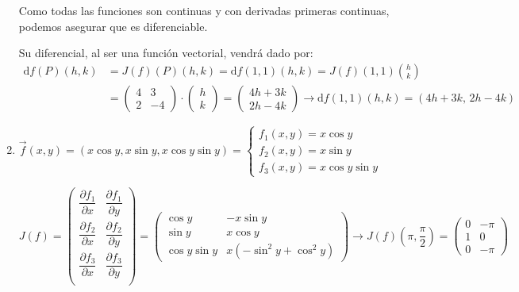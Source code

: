 \begin{enumerate}[label=\c olor{red}\textbf{\arabic*)}, leftmargin=*]
Como todas las funciones son continuas y con derivadas primeras continuas, podemos asegurar que es diferenciable.

Su diferencial, al ser una función vectorial, vendrá dado por:
\[ \begin{aligned}
\mathrm{d}f(P)(h,k)&=J(f)(P)(h,k)=\mathrm{d}f(1,1)(h,k)=J(f)(1,1)\binom{h}{k}\\
&=\begin{pmatrix}
4 & 3 \\
2 & -4
\end{pmatrix}\cdot\begin{pmatrix}
h\\
k
\end{pmatrix}=\begin{pmatrix}
4h+3k\\
2h-4k
\end{pmatrix}\longrightarrow \mathrm{d}f(1,1)(h,k)=(4h+3k,\,2h-4k)
\end{aligned} \]

\item {}

$\vec{f}(x,y)=(x\cos y,x\sin y,x\cos y\sin y)=\begin{cases}
f_{1}(x,y)=x\cos y\\
f_{2}(x,y)=x\sin y\\
f_{3}(x,y)=x\cos y\sin y
\end{cases}$

$J(f)=\begin{pmatrix}
\dfrac{\partial f_{1}}{\partial x} & \dfrac{\partial f_1}{\partial y} \\ 
\dfrac{\partial f_{2}}{\partial x} & \dfrac{\partial f_2}{\partial y} \\ 
\dfrac{\partial f_{3}}{\partial x} & \dfrac{\partial f_3}{\partial y} \\ 
\end{pmatrix}=\begin{pmatrix}
\cos y & -x\sin y \\ 
\sin y & x\cos y \\ 
\cos y\sin y & x(-\sin^{2}y+\cos^{2}y)
\end{pmatrix}\longrightarrow J(f)\left(\pi,\dfrac{\pi}{2}\right)=\begin{pmatrix}
0 & -\pi \\ 
1 & 0 \\ 
0 & -\pi
\end{pmatrix}  $


\end{enumerate}
